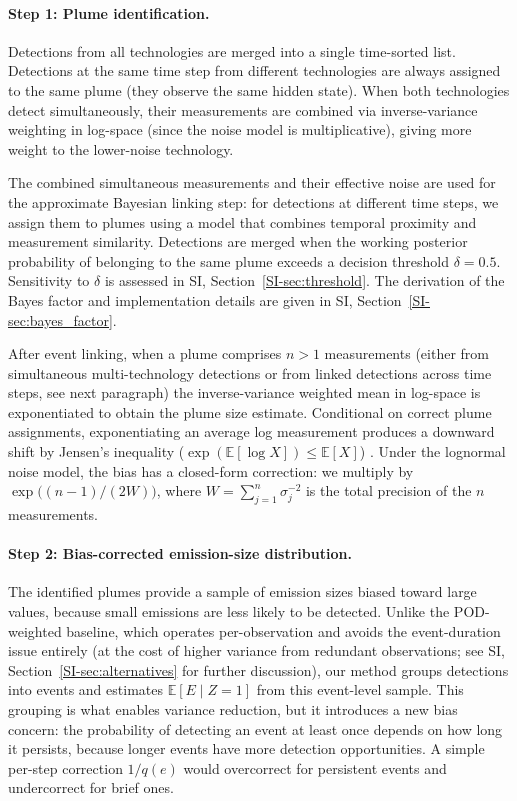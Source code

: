 \documentclass[numsec,webpdf,modern,mediumone]{oup-authoring-template}
\begin{document}
\paragraph{Step 1: Plume identification.}
Detections from all technologies are merged into a single time-sorted list. Detections at the same time step from different technologies are always assigned to the same plume (they observe the same hidden state). When both technologies detect simultaneously, their measurements are combined via inverse-variance weighting in log-space (since the noise model is multiplicative), giving more weight to the lower-noise technology.

The combined simultaneous measurements and their effective noise are used for the approximate Bayesian linking step: for detections at different time steps, we assign them to plumes using a model that combines temporal proximity and measurement similarity. Detections are merged when the working posterior probability of belonging to the same plume exceeds a decision threshold $\delta = 0.5$. Sensitivity to $\delta$ is assessed in SI, Section~\ref{SI-sec:threshold}. The derivation of the Bayes factor and implementation details are given in SI, Section~\ref{SI-sec:bayes_factor}.

After event linking, when a plume comprises $n > 1$ measurements (either from simultaneous multi-technology detections or from linked detections across time steps, see next paragraph) the inverse-variance weighted mean in log-space is exponentiated to obtain the plume size estimate. Conditional on correct plume assignments, exponentiating an average log measurement produces a downward shift by Jensen's inequality ($\exp(\mathbb{E}[\log X]) \leq \mathbb{E}[X]$) \citep{CoverThomas2006}. Under the lognormal noise model, the bias has a closed-form correction: we multiply by $\exp\bigl((n-1)/(2W)\bigr)$, where $W = \sum_{j=1}^{n} \sigma_j^{-2}$ is the total precision of the $n$ measurements.

\paragraph{Step 2: Bias-corrected emission-size distribution.}
The identified plumes provide a sample of emission sizes biased toward large values, because small emissions are less likely to be detected. Unlike the POD-weighted baseline, which operates per-observation and avoids the event-duration issue entirely (at the cost of higher variance from redundant observations; see SI, Section~\ref{SI-sec:alternatives} for further discussion), our method groups detections into events and estimates $\mathbb{E}[E \mid Z=1]$ from this event-level sample. This grouping is what enables variance reduction, but it introduces a new bias concern: the probability of detecting an event at least once depends on how long it persists, because longer events have more detection opportunities. A simple per-step correction $1/q(e)$ would overcorrect for persistent events and undercorrect for brief ones.
\end{document}
